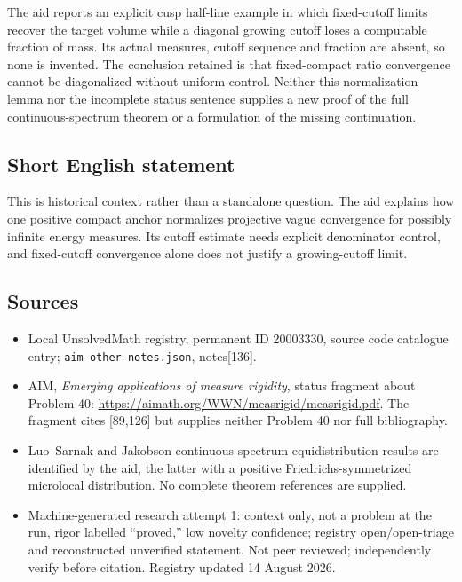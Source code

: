 \documentclass[11pt]{article}
\begin{document}
The aid reports an explicit cusp half-line example in which fixed-cutoff limits recover the target volume while a diagonal growing cutoff loses a computable fraction of mass. Its actual measures, cutoff sequence and fraction are absent, so none is invented. The conclusion retained is that fixed-compact ratio convergence cannot be diagonalized without uniform control. Neither this normalization lemma nor the incomplete status sentence supplies a new proof of the full continuous-spectrum theorem or a formulation of the missing continuation.
\subsection{Short English statement}
This is historical context rather than a standalone question. The aid explains how one positive compact anchor normalizes projective vague convergence for possibly infinite energy measures. Its cutoff estimate needs explicit denominator control, and fixed-cutoff convergence alone does not justify a growing-cutoff limit.
\subsection{Sources}
\begin{itemize}
\item Local UnsolvedMath registry, permanent ID 20003330, source code catalogue entry; \texttt{aim-other-notes.json}, notes[136].
\item AIM, \emph{Emerging applications of measure rigidity}, status fragment about Problem 40: \url{https://aimath.org/WWN/measrigid/measrigid.pdf}. The fragment cites [89,126] but supplies neither Problem 40 nor full bibliography.
\item Luo--Sarnak and Jakobson continuous-spectrum equidistribution results are identified by the aid, the latter with a positive Friedrichs-symmetrized microlocal distribution. No complete theorem references are supplied.
\item Machine-generated research attempt 1: context only, not a problem at the run, rigor labelled ``proved,'' low novelty confidence; registry open/open-triage and reconstructed unverified statement. Not peer reviewed; independently verify before citation. Registry updated 14 August 2026.
\end{itemize}
\end{document}
